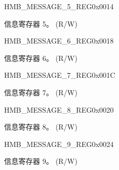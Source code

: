 \begin{register}{H}{MB\_MESSAGE\_5\_REG}{0x0014}\label{regdesc:MBMESSAGE5REG}
%
\regnewline%
\begin{regdesc}\begin{reglist}
\label{fielddesc:MBMESSAGE5}\item [MB\_MESSAGE\_5] 信息寄存器 5。 (R/W)
\end{reglist}\end{regdesc}
\end{register}


\begin{register}{H}{MB\_MESSAGE\_6\_REG}{0x0018}\label{regdesc:MBMESSAGE6REG}
%
\regnewline%
\begin{regdesc}\begin{reglist}
\label{fielddesc:MBMESSAGE6}\item [MB\_MESSAGE\_6] 信息寄存器 6。 (R/W)
\end{reglist}\end{regdesc}
\end{register}


\begin{register}{H}{MB\_MESSAGE\_7\_REG}{0x001C}\label{regdesc:MBMESSAGE7REG}
%
\regnewline%
\begin{regdesc}\begin{reglist}
\label{fielddesc:MBMESSAGE7}\item [MB\_MESSAGE\_7] 信息寄存器 7。 (R/W)
\end{reglist}\end{regdesc}
\end{register}


\begin{register}{H}{MB\_MESSAGE\_8\_REG}{0x0020}\label{regdesc:MBMESSAGE8REG}
%
\regnewline%
\begin{regdesc}\begin{reglist}
\label{fielddesc:MBMESSAGE8}\item [MB\_MESSAGE\_8] 信息寄存器 8。 (R/W)
\end{reglist}\end{regdesc}
\end{register}


\begin{register}{H}{MB\_MESSAGE\_9\_REG}{0x0024}\label{regdesc:MBMESSAGE9REG}
%
\regnewline%
\begin{regdesc}\begin{reglist}
\label{fielddesc:MBMESSAGE9}\item [MB\_MESSAGE\_9] 信息寄存器 9。 (R/W)
\end{reglist}\end{regdesc}
\end{register}


